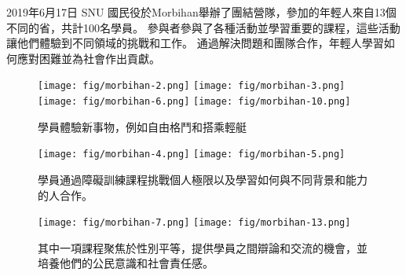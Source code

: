 \documentclass[a4paper,14pt]{extarticle}
\theoremstyle{plain}
\theoremstyle{remark}
\numberwithin{equation}{section}
\begin{document}
\begin{itemize}



2019年6月17日 SNU 國民役於Morbihan舉辦了團結營隊，參加的年輕人來自13個不同的省，共計100名學員。
參與者參與了各種活動並學習重要的課程，這些活動讓他們體驗到不同領域的挑戰和工作。
     通過解決問題和團隊合作，年輕人學習如何應對困難並為社會作出貢獻。

\begin{figure}[H]
  \begin{center}
    \texttt{[image: fig/morbihan-2.png]}
    \texttt{[image: fig/morbihan-3.png]}
    \texttt{[image: fig/morbihan-6.png]}
    \texttt{[image: fig/morbihan-10.png]}
  \end{center}
  \caption{學員體驗新事物，例如自由格鬥和搭乘輕艇}
\end{figure}

  \begin{figure}[H]
    \centering
    \texttt{[image: fig/morbihan-4.png]}
    \texttt{[image: fig/morbihan-5.png]}
    \caption{學員通過障礙訓練課程挑戰個人極限以及學習如何與不同背景和能力的人合作。}
  \end{figure}

%
%
%
%
%


\begin{figure}[H]
  \begin{center}
    \texttt{[image: fig/morbihan-7.png]}
    \texttt{[image: fig/morbihan-13.png]}
  \end{center}
  \caption{其中一項課程聚焦於性別平等，提供學員之間辯論和交流的機會，並培養他們的公民意識和社會責任感。}
\end{figure}


\end{itemize}
\end{document}
